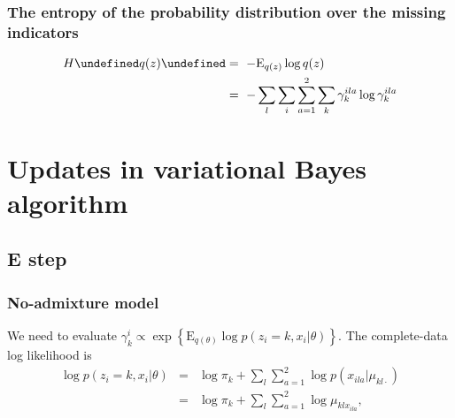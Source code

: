 \documentclass[12pt,a4paper,reqno]{article}
\newcommand{\E}{\text{E}{}}
\let\(\undefined
\let\)\undefined
\newcommand{\(}{\left(}
\newcommand{\)}{\right)}
\newcommand{\|}{\arrowvert}
\begin{document}
\subsubsection{The entropy of the probability distribution over the missing indicators}

\begin{align*}
  H\(q(z)\) 
  &=~ -\E_{q(z)} \log q(z) \\
  &=~ -\sum_{l}\sum_{i}\sum_{a=1}^{2} \sum_{k} \gamma^{ila}_{k} \log \gamma^{ila}_{k}\\
\end{align*}



\newpage{}
\appendix{}
\section{Updates in variational Bayes algorithm}

\subsection{E step}

\subsubsection{No-admixture model}
\label{E-step-appendix-no-admixture}
We need to evaluate $\gamma^{i}_{k} \propto \exp\left\{\E_{q(\theta)} \log p(z_{i}=k,x_{i}|\theta)\right\}$. The complete-data log likelihood is
\begin{eqnarray*}
\log p(z_{i}=k,x_{i}|\theta) 
&=& \log \pi_{k} + \sum_{l}\sum_{a=1}^{2}\log p(x_{ila}|\mu_{kl\cdot}) \\
&=& \log \pi_{k} + \sum_{l}\sum_{a=1}^{2} \log \mu_{klx_{ila}},
\end{eqnarray*}
\end{document}
